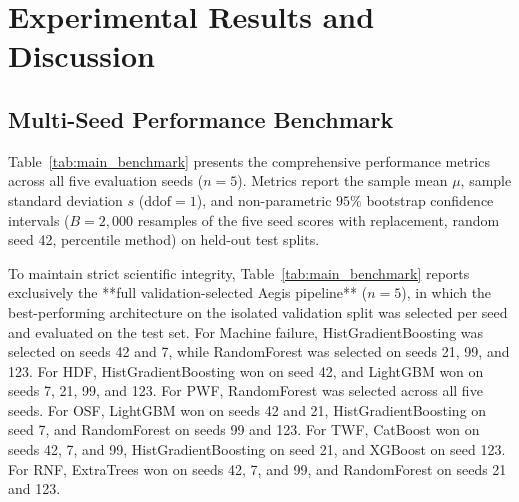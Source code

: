 \documentclass[conference]{IEEEtran}
\begin{document}
\section{Experimental Results and Discussion}

\subsection{Multi-Seed Performance Benchmark}
Table~\ref{tab:main_benchmark} presents the comprehensive performance metrics across all five evaluation seeds ($n=5$). Metrics report the sample mean $\mu$, sample standard deviation $s$ ($\text{ddof}=1$), and non-parametric $95\%$ bootstrap confidence intervals ($B=2,000$ resamples of the five seed scores with replacement, random seed 42, percentile method) on held-out test splits. 

To maintain strict scientific integrity, Table~\ref{tab:main_benchmark} reports exclusively the **full validation-selected Aegis pipeline** ($n=5$), in which the best-performing architecture on the isolated validation split was selected per seed and evaluated on the test set. For Machine failure, HistGradientBoosting was selected on seeds 42 and 7, while RandomForest was selected on seeds 21, 99, and 123. For HDF, HistGradientBoosting won on seed 42, and LightGBM won on seeds 7, 21, 99, and 123. For PWF, RandomForest was selected across all five seeds. For OSF, LightGBM won on seeds 42 and 21, HistGradientBoosting on seed 7, and RandomForest on seeds 99 and 123. For TWF, CatBoost won on seeds 42, 7, and 99, HistGradientBoosting on seed 21, and XGBoost on seed 123. For RNF, ExtraTrees won on seeds 42, 7, and 99, and RandomForest on seeds 21 and 123.
\end{document}
